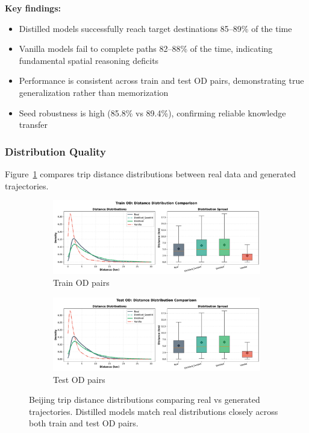 \textbf{Key findings:}
\begin{itemize}[noitemsep,topsep=0pt]
    \item Distilled models successfully reach target destinations 85--89\% of the time
    \item Vanilla models fail to complete paths 82--88\% of the time, indicating fundamental spatial reasoning deficits
    \item Performance is consistent across train and test OD pairs, demonstrating true generalization rather than memorization
    \item Seed robustness is high (85.8\% vs 89.4\%), confirming reliable knowledge transfer
\end{itemize}

\subsubsection{Distribution Quality}

Figure~\ref{fig:beijing-distance-distributions} compares trip distance distributions between real data and generated trajectories.

\begin{figure}[t]
    \centering
    \begin{subfigure}{0.49\linewidth}
        \centering
        \includegraphics[width=\linewidth]{assets/plots/eval/beijing/distributions/distance_distribution_train_od.pdf}
        \caption{Train OD pairs}
    \end{subfigure}
    \begin{subfigure}{0.49\linewidth}
        \centering
        \includegraphics[width=\linewidth]{assets/plots/eval/beijing/distributions/distance_distribution_test_od.pdf}
        \caption{Test OD pairs}
    \end{subfigure}
    \caption{Beijing trip distance distributions comparing real vs generated trajectories. Distilled models match real distributions closely across both train and test OD pairs.}
    \label{fig:beijing-distance-distributions}
\end{figure}

